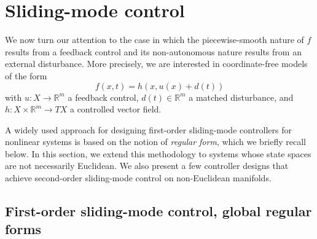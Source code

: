 \documentclass{article}
\theoremstyle{definition}
\theoremstyle{remark}
\newcommand{\MA}{X}	%
\newcommand{\RR}{\mathbb{R}}	%
\begin{document}
\section{Sliding-mode control} \label{sec:design}

We now turn our attention to the case in which the piecewise-smooth nature of $f$ results from a 
feedback control and its non-autonomous nature results from an external disturbance. More precisely,
we are interested in coordinate-free models of the form
\begin{equation} \label{eq:system_u}
 f(x,t) = h(x,u(x)+d(t))
\end{equation}
with $u : \MA \to \RR^m$ a feedback control, $d(t) \in \RR^m$ a matched disturbance,
and $h : \MA\times \RR^m \to T\MA$ a controlled vector field. 

A widely used approach for designing first-order sliding-mode controllers for nonlinear systems is based
on the notion of \emph{regular form}, which we briefly recall below. In this section, we extend this methodology 
to systems whose state spaces are not necessarily Euclidean. We also present a few controller designs that achieve second-order 
sliding-mode control on non-Euclidean manifolds.

\subsection{First-order sliding-mode control, global regular forms}
\end{document}
